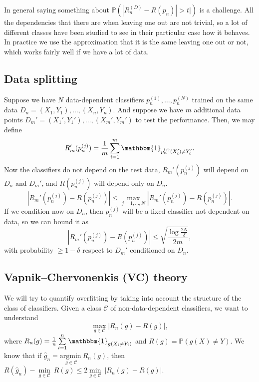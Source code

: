 \documentclass[11pt, english]{article}
\begin{document}
In general saying something about $\mathbb{P}(|R_n^{(D)}-R(p_n)|>t|)$ is a challenge. All the dependencies that there are when leaving one out are not trivial, so a lot of different classes have been studied to see in their particular case how it behaves. In practice we use the approximation that it is the same leaving one out or not, which works fairly well if we have a lot of data. 

\subsection{Data splitting}

Suppose we have $N$ data-dependent classifiers $p_n^{(1)},\dots,p_n^{(N)}$ trained on the same data $D_n=(X_1,Y_1),\dots,(X_n,Y_n)$. And suppose we have $m$ additional data points $D_m'=(X_1',Y_1'),\dots,(X_m',Y_m')$ to test the performance. Then, we may define \begin{equation}
	R_m'(p_n^{(j)})=\frac{1}{m}\sum\limits_{i=1}^m\mathbbm{1}_{p_n^{(j)}(X_i')\neq Y_i'}. 
\end{equation}
Now the classifiers do not depend on the test data, $R_m'(p_n^{(j)})$ will depend on $D_n$ and $D_m'$, and $R(p_n^{(j)})$ will depend only on $D_n$.
\begin{equation}
	|R_m'(p_n^{(j)})-R(p_n^{(j)})|\leq \underset{j=1,\dots,N}{\max}|R_m'(p_n^{(j)})-R(p_n^{(j)})|.
\end{equation}
If we condition now on $D_n$, then $p_n^{(j)}$ will be a fixed classifier not dependent on data, so we can bound it as
\begin{equation}
	|R_m'(p_n^{(j)})-R(p_n^{(j)})|\leq \sqrt{\frac{\log\frac{2N}{\delta}}{2m}},
\end{equation}
with probability $\geq 1-\delta$ respect to $D_m'$ conditioned on $D_n$. \\

\subsection{Vapnik–Chervonenkis (VC) theory}

We will try to quantify overfitting by taking into account the structure of the class of classifiers. Given a class $\mathcal{C}$ of non-data-dependent classifiers, we want to understand 
\begin{equation}
	\underset{g\in\mathcal{C}}{\max}|R_n(g)-R(g)|,
\end{equation}
where $R_n(g)=\frac{1}{n}\sum\limits_{i=1}^n\mathbbm{1}_{g(X_i\neq Y_i)}$ and $R(g)=\mathbb{P}(g(X)\neq Y)$. We know that if $\hat{g}_n=\underset{g\in\mathcal{C}}{\text{argmin}\ }R_n(g)$, then $R(\hat{g}_n)-\underset{g\in\mathcal{C}}{\min}\ R(g)\leq2\underset{g\in\mathcal{C}}{\min}\ |R_n(g)-R(g)|$.\\ 
\end{document}
